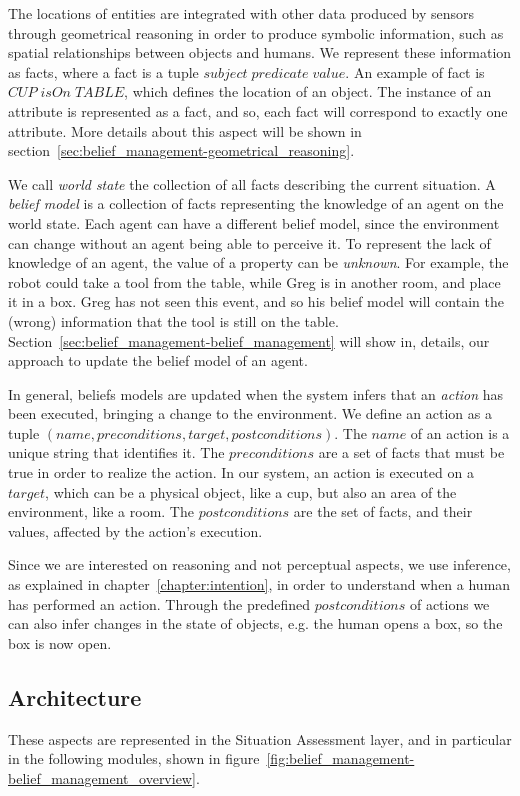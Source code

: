The locations of entities are integrated with other data produced by sensors through geometrical reasoning in order to produce symbolic information, such as spatial relationships between objects and humans. We represent these information as facts, where a fact is a tuple $subject\; predicate\; value$. An example of fact is $CUP\; isOn\; TABLE$, which defines the location of an object. The instance of an attribute is represented as a fact, and so, each fact will correspond to exactly one attribute. More details about this aspect will be shown in section~\ref{sec:belief_management-geometrical_reasoning}.

We call \textit{world state} the collection of all facts describing the current situation. A \textit{belief model} is a collection of facts representing the knowledge of an agent on the world state. Each agent can have a different belief model, since the environment can change without an agent being able to perceive it. To represent the lack of knowledge of an agent, the value of a property can be \textit{unknown}. For example, the robot could take a tool from the table, while Greg is in another room, and place it in a box. Greg has not seen this event, and so his belief model will contain the (wrong) information that the tool is still on the table.  Section~\ref{sec:belief_management-belief_management} will show in, details, our approach to update the belief model of an agent.

In general, beliefs models are updated when the system infers that an \textit{action} has been executed, bringing a change to the environment.  We define an action as a tuple $(name, preconditions, target, postconditions)$. The $name$ of an action is a unique string that identifies it. The $preconditions$ are a set of facts that must be true in order to realize the action. In our system, an action is executed on a $target$, which can be a physical object, like a cup, but also an area of the environment, like a room. The $postconditions$ are the set of facts, and their values, affected by the action's execution.  


Since we are interested on reasoning and not perceptual aspects, we use inference, as explained in chapter~\ref{chapter:intention}, in order to understand when a human has performed an action. Through the predefined $postconditions$ of actions we can also infer changes in the state of objects, e.g. the human opens a box, so the box is now open. 


\subsection{Architecture}
These aspects are represented in the Situation Assessment layer, and in particular in the following modules, shown in figure~\ref{fig:belief_management-belief_management_overview}.

